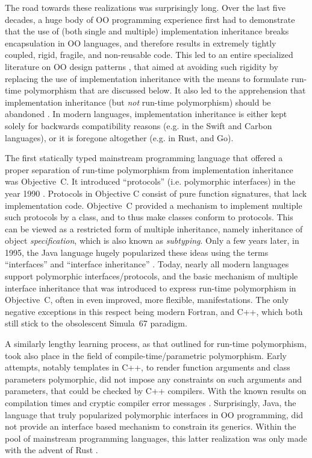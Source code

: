 \documentclass[11pt,oneside]{report}
\begin{document}
The road towards these realizations was surprisingly long. Over
the last five decades, a huge body of OO programming experience first
had to demonstrate that the use of (both single and multiple)
implementation inheritance breaks encapsulation in OO languages, and
therefore results in extremely tightly coupled, rigid, fragile, and
non-reusable code. This led to an entire specialized literature on OO
design patterns \cite{Gamma_et_al_94,Martin_03,Holub_04}, that aimed
at avoiding such rigidity by replacing the use of implementation
inheritance with the means to formulate run-time polymorphism that are
discussed below. It also led to the apprehension that implementation
inheritance (but \emph{not} run-time polymorphism) should be abandoned
\cite{Weck_Szyperski}. In modern languages, implementation inheritance
is either kept solely for backwards compatibility reasons (e.g. in the
Swift and Carbon languages), or it is foregone altogether (e.g. in
Rust, and Go).

The first statically typed mainstream programming language that
offered a proper separation of run-time polymorphism from
implementation inheritance was Objective~C. It introduced
``protocols'' (i.e. polymorphic interfaces) in the year 1990
\cite{Cox_et_al_20}. Protocols in Objective C consist of pure function
signatures, that lack implementation code. Objective~C provided a
mechanism to implement multiple such protocols by a class, and to thus
make classes conform to protocols. This can be viewed as a restricted
form of multiple inheritance, namely inheritance of object
\emph{specification}, which is also known as \emph{subtyping}. Only a
few years later, in 1995, the Java language hugely popularized these
ideas using the terms ``interfaces'' and ``interface inheritance''
\cite{Cox_et_al_20}. Today, nearly all modern languages support
polymorphic interfaces/protocols, and the basic mechanism of multiple
interface inheritance that was introduced to express run-time
polymorphism in Objective~C, often in even improved, more flexible,
manifestations. The only negative exceptions in this respect being
modern Fortran, and C++, which both still stick to the obsolescent
Simula~67 paradigm.

A similarly lengthy learning process, as that outlined for run-time
polymorphism, took also place in the field of compile-time/parametric
polymorphism. Early attempts, notably templates in C++, to render
function arguments and class parameters polymorphic, did not impose
any constraints on such arguments and parameters, that could be
checked by C++ compilers. With the known results on compilation times
and cryptic compiler error messages
\cite{Haveraaen_et_al_19}. Surprisingly, Java, the language that truly
popularized polymorphic interfaces in OO programming, did not provide
an interface based mechanism to constrain its generics. Within the
pool of mainstream programming languages, this latter realization was
only made with the advent of Rust \cite{Matsakis_2014}.
\end{document}
